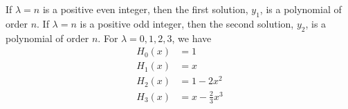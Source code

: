 {\begin{Solution}
  If $\lambda = n$ is a positive even integer, then the first solution,
  $y_1$, is a polynomial of order $n$.
  If $\lambda = n$ is a positive odd integer, then the second solution,
  $y_2$, is a polynomial of order $n$.
  For $\lambda = 0,1,2,3$, we have
  \begin{align*}
    H_0(x) &= 1 \\
    H_1(x) &= x \\
    H_2(x) &= 1 - 2 x^2 \\
    H_3(x) &= x - \frac{2}{3} x^3
  \end{align*}
\end{Solution}














}
